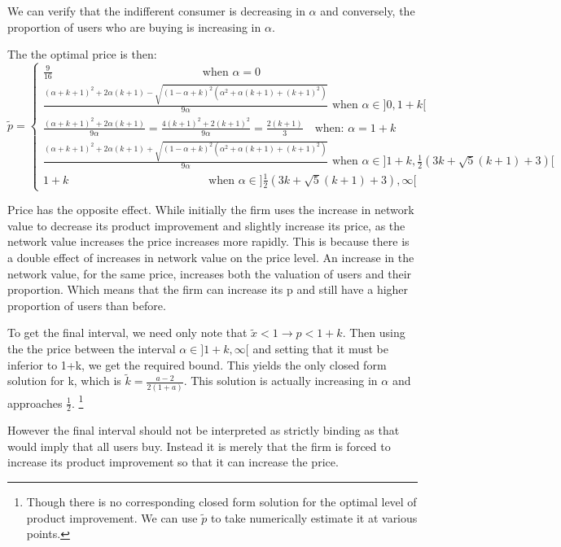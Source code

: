 \documentclass{article}
\begin{document}
We can verify that the indifferent consumer is decreasing in $\alpha$ and conversely, the proportion of users who are buying is increasing in $\alpha$. 

The the optimal price is then: 
\[
\tilde{p}= \left\{
                \begin{array}{ll}
\frac{9}{16} ~~~~~~~~~~~~~~~~~~~~~~~~~~~~~~~~~~~~~~~~~~~~~~~~~~~~~~~~~~
\text{ when  } \alpha = 0
\\
\frac{(\alpha+k+1)^2+2\alpha(k+1) - \sqrt{(1-\alpha+k)^2(\alpha^2+\alpha (k+1)+(k+1)^2)}}{9 \alpha} \text{ when  } \alpha \in ]0,1+k[
\\
\frac{(\alpha+k+1)^2+2\alpha(k+1)}{9 \alpha}= \frac{4(k+1)^2+2(k+1)^2}{9 \alpha}=\frac{2(k+1)}{3 }~~~\text{ when: } \alpha =1+k
                  \\
\frac{(\alpha+k+1)^2+2\alpha(k+1) + \sqrt{(1-\alpha+k)^2(\alpha^2+\alpha (k+1)+(k+1)^2)}}{9 \alpha} \text{ when  } \alpha \in ]1+k,\frac{1}{2} \left(3 k+\sqrt{5} (k+1)+3\right)[ 
\\
1+k ~~~~~~~~~~~~~~~~~~~~~~~~~~~~~~~~~~~~~~~~~~~~~~~~~~~~~~
\text{ when  } \alpha \in ]\frac{1}{2} \left(3 k+\sqrt{5} (k+1)+3\right),\infty[ 
                \end{array}
\right.
\]

Price has the opposite effect. While initially the firm uses the increase in network value to decrease its product improvement and slightly increase its price, as the network value increases the price increases more rapidly. This is because there is a double effect of increases in network value on the price level. An increase in the network value, for the same price, increases both the valuation of users and their proportion. Which means that the firm can increase its p and still have a higher proportion of users than before. 

To get the final interval, we need only note that $\tilde{x}<1 \rightarrow p<1+k$. Then using the the price between the interval $\alpha \in ]1+k, \infty[$ and setting that it must be inferior to 1+k, we get the required bound. This yields the only closed form solution for k, which is $\tilde{k} = \frac{a-2}{2 (1 + a)}$. This solution is actually increasing in $\alpha$ and approaches $\frac{1}{2}$. \footnote{Though there is no corresponding closed form solution for the optimal level of product improvement. We can use $\tilde{p}$ to take numerically estimate it at various points. 
}

However the final interval should not be interpreted as strictly binding as that would imply that all users buy. Instead it is merely that the firm is forced to increase its product improvement so that it can increase the price.  
\end{document}
